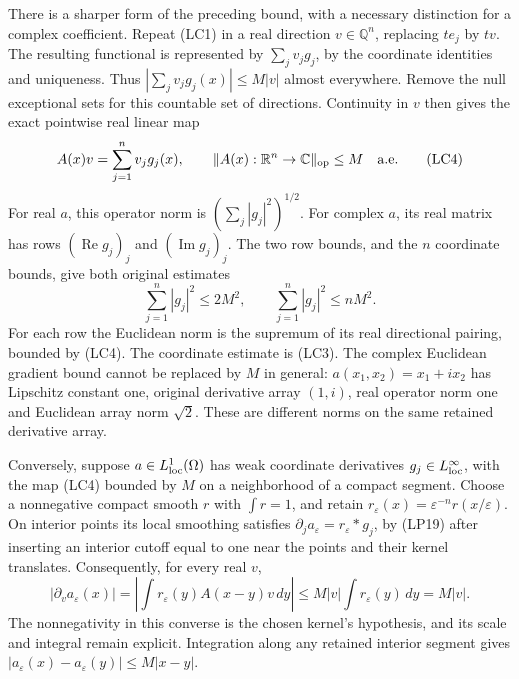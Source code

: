 \documentclass[
  11pt,
]{article}
\begin{document}
There is a sharper form of the preceding bound, with a necessary
distinction for a complex coefficient. Repeat (LC1) in a real direction
\(v\in\mathbb Q^n\), replacing \(te_j\) by \(tv\). The resulting
functional is represented by \(\sum_j v_jg_j\), by the coordinate
identities and uniqueness. Thus \(|\sum_jv_jg_j(x)|\leq M|v|\) almost
everywhere. Remove the null exceptional sets for this countable set of
directions. Continuity in \(v\) then gives the exact pointwise real
linear map \[
 A(x)v=\sum_{j=1}^n v_jg_j(x),\qquad
 \|A(x):\mathbb R^n\to\mathbb C\|_{\rm op}\leq M
                                      \quad\hbox{a.e.}          \tag{LC4}
\] For real \(a\), this operator norm is \((\sum_j|g_j|^2)^{1/2}\). For
complex \(a\), its real matrix has rows \((\operatorname{Re}g_j)_j\) and
\((\operatorname{Im}g_j)_j\). The two row bounds, and the \(n\)
coordinate bounds, give both original estimates \[
 \sum_{j=1}^n|g_j|^2\leq 2M^2,\qquad
 \sum_{j=1}^n|g_j|^2\leq nM^2 .
                                                               \tag{LC5}
\] For each row the Euclidean norm is the supremum of its real
directional pairing, bounded by (LC4). The coordinate estimate is (LC3).
The complex Euclidean gradient bound cannot be replaced by \(M\) in
general: \(a(x_1,x_2)=x_1+i x_2\) has Lipschitz constant one, original
derivative array \((1,i)\), real operator norm one and Euclidean array
norm \(\sqrt2\). These are different norms on the same retained
derivative array.

Conversely, suppose \(a\in L^1_{\rm loc}(\Omega)\) has weak coordinate
derivatives \(g_j\in L^\infty_{\rm loc}\), with the map (LC4) bounded by
\(M\) on a neighborhood of a compact segment. Choose a nonnegative
compact smooth \(r\) with \(\int r=1\), and retain
\(r_\varepsilon(x)=\varepsilon^{-n}r(x/\varepsilon)\). On interior
points its local smoothing satisfies
\(\partial_j a_\varepsilon=r_\varepsilon*g_j\), by (LP19) after
inserting an interior cutoff equal to one near the points and their
kernel translates. Consequently, for every real \(v\), \[
 |\partial_v a_\varepsilon(x)|
 =\left|\int r_\varepsilon(y)A(x-y)v\,dy\right|
 \leq M|v|\int r_\varepsilon(y)\,dy=M|v|.
                                                               \tag{LC6}
\] The nonnegativity in this converse is the chosen kernel's hypothesis,
and its scale and integral remain explicit. Integration along any
retained interior segment gives
\(|a_\varepsilon(x)-a_\varepsilon(y)|\leq M|x-y|\).
\end{document}

